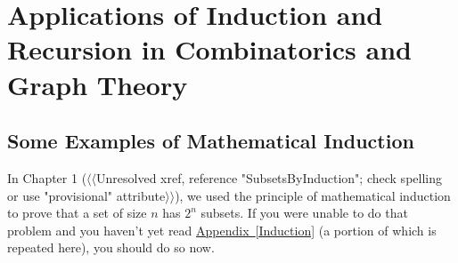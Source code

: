 \documentclass[10pt,]{book}
\theoremstyle{plain}
\theoremstyle{definition}
\numberwithin{equation}{chapter}
\begin{document}
\chapter[{Applications of Induction and Recursion in Combinatorics and Graph Theory}]{Applications of Induction and Recursion in Combinatorics and Graph Theory}\label{InductionRecursion}
\typeout{************************************************}
\typeout{************************************************}
\section[{Some Examples of Mathematical Induction}]{Some Examples of Mathematical Induction}\label{sec_induction-examples}
\typeout{************************************************}
\typeout{************************************************}
In Chapter 1 ({$\langle\langle$Unresolved xref, reference "SubsetsByInduction"; check spelling or use "provisional" attribute$\rangle\rangle$}), we used the principle of mathematical induction to prove that a set of size \(n\) has \(2^n\) subsets. If you were unable to do that problem and you haven't yet read \hyperref[Induction]{Appendix~\ref{Induction}} (a portion of which is repeated here), you should do so now.%
\typeout{************************************************}
\typeout{************************************************}
\end{document}
